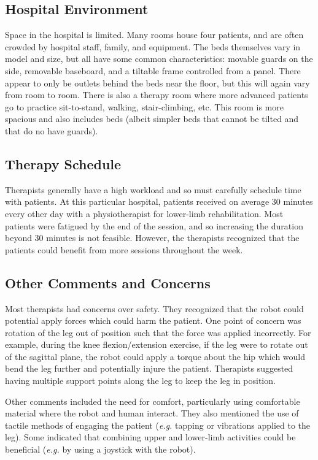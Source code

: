\documentclass[12pt]{report}
\begin{document}
	 \subsection{Hospital Environment}
	Space in the hospital is limited. Many rooms house four patients, and are often crowded by hospital staff, family, and equipment. The beds themselves vary in model and size, but all have some common characteristics: movable guards on the side, removable baseboard, and a tiltable frame controlled from a panel. There appear to only be outlets behind the beds near the floor, but this will again vary from room to room. 
	There is also a therapy room where more advanced patients go to practice sit-to-stand, walking, stair-climbing, etc. This room is more spacious and also includes beds (albeit simpler beds that cannot be tilted and that do no have guards). 
	
	\subsection{Therapy Schedule}
	
	Therapists generally have a high workload and so must carefully schedule time with patients. At this particular hospital, patients received on average 30 minutes every other day with a physiotherapist for lower-limb rehabilitation. Most patients were fatigued by the end of the session, and so increasing the duration beyond 30 minutes is not feasible. However, the therapists recognized that the patients could benefit from more sessions throughout the week. 
	
	\subsection{Other Comments and Concerns}
	
	Most therapists had concerns over safety. They recognized that the robot could potential apply forces which could harm the patient. One point of concern was rotation of the leg out of position such that the force was applied incorrectly. For example, during the knee flexion/extension exercise, if the leg were to rotate out of the sagittal plane, the robot could apply a torque about the hip which would bend the leg further and potentially injure the patient. Therapists suggested having multiple support points along the leg to keep the leg in position. 
	
	Other comments included the need for comfort, particularly using comfortable material where the robot and human interact. They also mentioned the use of tactile methods of engaging the patient (\textit{e.g.} tapping or vibrations applied to the leg). Some indicated that combining upper and lower-limb activities could be beneficial (\textit{e.g.} by using a joystick with the robot). 
	
\end{document}
